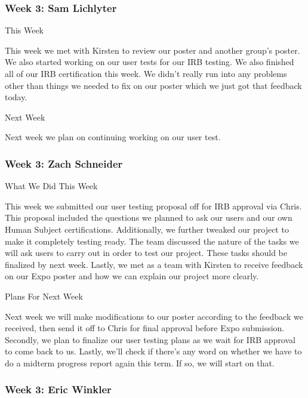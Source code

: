  \subsubsection{Week 3: Sam Lichlyter}

This Week

This week we met with Kirsten to review our poster and another group's poster. We also started working on our user tests for our IRB testing. We also finished all of our IRB certification this week. We didn't really run into any problems other than things we needed to fix on our poster which we just got that feedback today. 



Next Week

Next week we plan on continuing working on our user test. \\ 

 \subsubsection{Week 3: Zach Schneider}

What We Did This Week

This week we submitted our user testing proposal off for IRB approval via Chris. This proposal included the questions we planned to ask our users and our own Human Subject certifications. Additionally, we further tweaked our project to make it completely testing ready. The team discussed the nature of the tasks we will ask users to carry out in order to test our project. These tasks should be finalized by next week. Lastly, we met as a team with Kirsten to receive feedback on our Expo poster and how we can explain our project more clearly.



Plans For Next Week

Next week we will make modifications to our poster according to the feedback we received, then send it off to Chris for final approval before Expo submission. Secondly, we plan to finalize our user testing plans as we wait for IRB approval to come back to us. Lastly, we'll check if there's any word on whether we have to do a midterm progress report again this term. If so, we will start on that. \\ 

 \subsubsection{Week 3: Eric Winkler}

